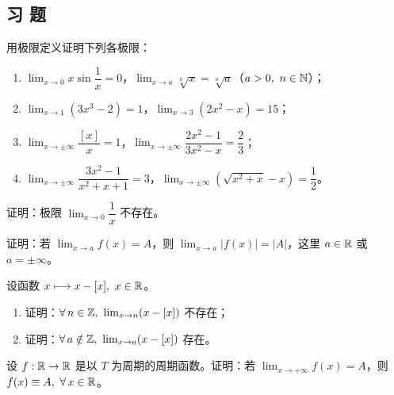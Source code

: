 \subsection*{习 题}

\begin{exercise}
	\item 用极限定义证明下列各极限：
	\begin{enumerate}[label=\arabic*)]
		\item \(\lim_{x\to0}x\sin\dfrac1x=0\)，\quad \(\lim_{x\to a}\sqrt[n]{x}=\sqrt[n]{a}\)（\(a>0,\ n\in\mathbb{N}\)）；
		\item \(\lim_{x\to1}(3x^3-2)=1\)，\quad \(\lim_{x\to3}(2x^2-x)=15\)；
		\item \(\lim_{x\to\pm\infty}\dfrac{[x]}{x}=1\)，\quad \(\lim_{x\to\pm\infty}\dfrac{2x^2-1}{3x^2-x}=\dfrac23\)；
		\item \(\lim_{x\to\pm\infty}\dfrac{3x^2-1}{x^2+x+1}=3\)，\quad \(\lim_{x\to\pm\infty}(\sqrt{x^2+x}-x)=\dfrac12\)。
	\end{enumerate}
\end{exercise}

\begin{exercise}
	\item 证明：极限 \(\lim_{x\to0}\dfrac1x\) 不存在。
\end{exercise}

\begin{exercise}
	\item 证明：若 \(\lim_{x\to a}f(x)=A\)，则 \(\lim_{x\to a}|f(x)|=|A|\)，这里 \(a\in\mathbb{R}\) 或 \(a=\pm\infty\)。
\end{exercise}

\begin{exercise}
	\item 设函数 \(x\longmapsto x-[x],\ x\in\R\)。
	\begin{enumerate}[label=\arabic*)]
		\item 证明：\(\forall\,n\in\mathbb{Z},\ \lim_{x\to n}(x-[x])\) 不存在；
		\item 证明：\(\forall\,a\notin\mathbb{Z},\ \lim_{x\to a}(x-[x])\) 存在。
	\end{enumerate}
\end{exercise}

\begin{exercise}
	\item 设 \(f:\mathbb{R}\to\mathbb{R}\) 是以 \(T\) 为周期的周期函数。证明：若 \(\lim_{x\to+\infty}f(x)=A\)，则 \(f(x)\equiv A,\ \forall\,x\in\mathbb{R}\)。
\end{exercise}

